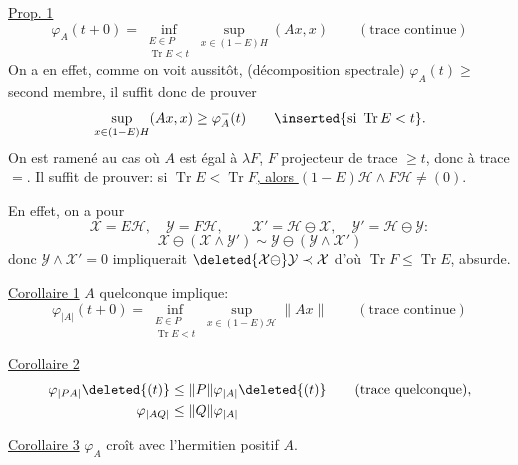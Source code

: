 
\uline{Prop. 1}
\[
\varphi_A(t+0)=
\inf_{\substack{E\in P\\\operatorname{Tr}E<t}}
\sup_{x\in(1-E)H}(Ax,x)
\qquad(\text{trace continue})
\]
On a en effet, comme on voit aussitôt, (décomposition spectrale)
$\varphi_A(t)\geq$ second membre, il suffit donc de prouver
\[
\sup_{x\in(1-E)H}(Ax,x)\geq\varphi_A^-(t)
\qquad\inserted{\text{si }\operatorname{Tr}E<t}.
\]
On est ramené au cas où $A$ est égal à $\lambda F$, $F$ projecteur de trace $\geq t$, donc à trace $=$.
Il suffit de prouver: si \uline{$\operatorname{Tr}E<\operatorname{Tr}F$, alors $(1-E)\mathcal H\wedge F\mathcal H\ne(0)$}.

En effet, on a  pour
\[
\mathcal X=E\mathcal H,\quad\mathcal Y=F\mathcal H,\qquad
\mathcal X'=\mathcal H\ominus\mathcal X,\quad
\mathcal Y'=\mathcal H\ominus\mathcal Y:
\]
\[
\mathcal X\ominus(\mathcal X\wedge\mathcal Y')\sim
\mathcal Y\ominus(\mathcal Y\wedge\mathcal X')
\]
donc $\mathcal Y\wedge\mathcal X'=0$ impliquerait
$\deleted{\mathcal X\ominus}\mathcal Y\prec\mathcal X$
d'où $\operatorname{Tr}F\leq\operatorname{Tr}E$, absurde.

\uline{Corollaire 1} $A$ quelconque implique:
\[
\varphi_{|A|}(t+0)=\inf_{\substack{E\in P\\\operatorname{Tr}E<t}}
\sup_{x\in(1-E)\mathcal H}\|Ax\|
\qquad(\text{trace continue})
\]

\uline{Corollaire 2}
\[
\begin{aligned}
\varphi_{|PA|}\deleted{(t)}&\leq\|P\|\varphi_{|A|}\deleted{(t)}
\qquad(\text{trace quelconque}),\\
\varphi_{|AQ|}&\leq\|Q\|\varphi_{|A|}
\end{aligned}
\]

\uline{Corollaire 3} $\varphi_A$ croît avec l'hermitien positif $A$.

